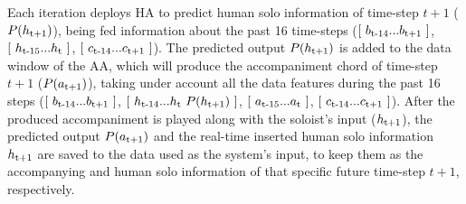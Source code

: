         Each iteration deploys HA to predict human solo information of time-step $t+1$  ($P(h\textsubscript{t+1})$), being fed information about the past 16 time-steps ($[\ b\textsubscript{t-14}...b\textsubscript{t+1}\ ]$, $[\ h\textsubscript{t-15}...h\textsubscript{t}\ ]$, $[\ c\textsubscript{t-14}...c\textsubscript{t+1}\ ]$). The predicted output $P(h\textsubscript{t+1})$ is added to the data window of the AA, which will produce the accompaniment chord of time-step $t+1$ ($P(a\textsubscript{t+1})$), taking under account all the data features during the past 16 steps ($[\ b\textsubscript{t-14}...b\textsubscript{t+1}\ ]$, $[\ h\textsubscript{t-14}...h\textsubscript{t}\ P(h\textsubscript{t+1})\ ]$, $[\ a\textsubscript{t-15}...a\textsubscript{t}\ ]$, $[\ c\textsubscript{t-14}...c\textsubscript{t+1}\ ]$). After the produced accompaniment is played along with the soloist's input ($h\textsubscript{t+1}$), the predicted output $P(a\textsubscript{t+1})$ and the real-time inserted human solo information $h\textsubscript{t+1}$ are saved to the data used as the system's input, to keep them as the accompanying and human solo information of that specific future time-step $t+1$, respectively. 

    